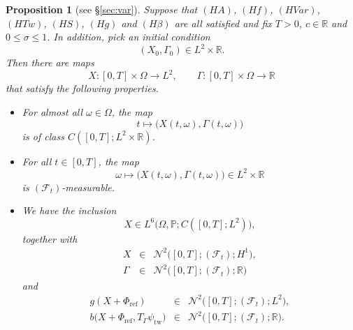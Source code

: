 \documentclass[10pt]{articleHJ}
\newcommand{\Real}{\mathbb{R}}							%
\newtheorem{prop}[thm]{Proposition}
\numberwithin{equation}{section}
\begin{document}
\begin{prop}[{see \S\ref{sec:var}}]
\label{prp:mr:main:ex}
Suppose that $(HA)$, $(Hf)$, $(HVar)$,
$(HTw)$, $(HS)$, $(Hg)$ and $(H\beta)$ are all satisfied
and fix $T > 0$, $c \in \Real$ and $0 \le \sigma \le 1$.
In addition, pick an initial condition
\begin{equation}
  (X_0, \Gamma_0) \in L^2 \times \Real.
\end{equation}
Then there are maps
\begin{equation}
X: [0, T] \times \Omega \to L^2,
\qquad
\Gamma: [0,T] \times \Omega \to \Real
\end{equation}
that satisfy the following properties.
\begin{itemize}
\item[(i)]{
  For almost all $\omega \in \Omega$,
  the map
  \begin{equation}
  t \mapsto \big( X(t, \omega) , \Gamma(t, \omega) \big)
  \end{equation}
  is of class $C([0,T]; L^2 \times \Real)$.
}
\item[(ii)]{
  For all $t \in [0,T]$, the map
  \begin{equation}
  \omega \mapsto \big( X(t, \omega), \Gamma(t, \omega) \big)
    \in L^2 \times \Real
  \end{equation}
  is $(\mathcal{F}_t)$-measurable.
}
\item[(iii)]{
  We have the inclusion
  \begin{equation}\label{eq:mr:inclL2}
  X \in L^6\big( \Omega, \mathbb{P} ; C([0,T]; L^2 ) \big),
  \end{equation}
  together with
  \begin{equation}
  \label{eq:prp:mr:ex:inclusions:n2:x:gamma}
  \begin{array}{lcl}
     X & \in &  \mathcal{N}^2 \big( [0 , T] ; (\mathcal{F}_t ) ; H^1 \big) ,
  \\[0.2cm]
     \Gamma & \in &  \mathcal{N}^2 \big( [0 , T] ; (\mathcal{F}_t ) ; \Real \big)
  \end{array}
  \end{equation}
  and
  \begin{equation}
  \label{eq:mr:main:ex:inclusions:g:b}
  \begin{array}{lcl}
     g(X + \Phi_{\mathrm{ref}})
      & \in &
       \mathcal{N}^2 \big( [0 , T] ; (\mathcal{F}_t ) ; L^2 \big),
     \\[0.2cm]
     b\big(X + \Phi_{\mathrm{ref}}, T_{\Gamma} \psi_{\mathrm{tw}} \big)
      & \in &
       \mathcal{N}^2 \big( [0 , T] ; (\mathcal{F}_t ) ; \Real \big) .

\end{array}
\end{equation}}
\end{itemize}
\end{prop}
\end{document}
